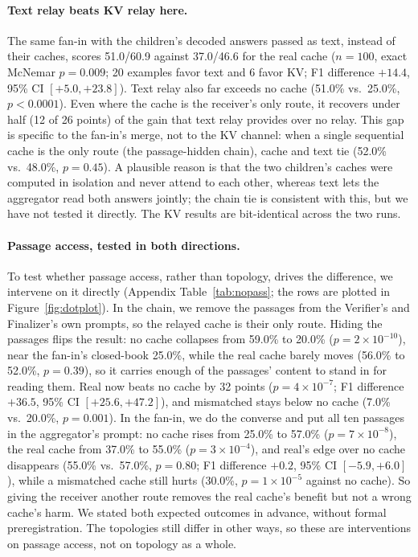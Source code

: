 \documentclass[11pt]{article}
\begin{document}
\paragraph{Text relay beats KV relay here.} The same fan-in with the children's
decoded answers passed as text, instead of their caches, scores 51.0/60.9 against
37.0/46.6 for the real cache ($n{=}100$, exact McNemar $p=0.009$; 20 examples
favor text and 6 favor KV; F1 difference $+14.4$, 95\% CI $[+5.0,+23.8]$). Text
relay also far exceeds no cache (51.0\% vs.\ 25.0\%, $p<0.0001$). Even where
the cache is the receiver's only route, it recovers under half (12 of 26 points) of
the gain that text relay provides over no relay. This gap is specific to
the fan-in's merge, not to the KV channel: when a single sequential cache is the
only route (the passage-hidden chain), cache and text tie (52.0\% vs.\ 48.0\%,
$p=0.45$). A plausible reason is that the two children's caches were computed in
isolation and never attend to each other, whereas text lets the aggregator read both
answers jointly; the chain tie is consistent with this, but we have not tested it
directly. The KV results are bit-identical across the two runs.



\paragraph{Passage access, tested in both directions.} To test whether passage
access, rather than topology, drives the difference, we intervene on it directly
(Appendix Table~\ref{tab:nopass}; the rows are plotted in
Figure~\ref{fig:dotplot}). In the chain, we remove the passages from the
Verifier's and Finalizer's own prompts, so the relayed cache is their only route.
Hiding the passages flips the result: no cache collapses from 59.0\% to
20.0\% ($p=2\times10^{-10}$), near the fan-in's closed-book 25.0\%, while the real
cache barely moves (56.0\% to 52.0\%, $p=0.39$), so it carries enough of the
passages' content to stand in for reading them. Real now beats no cache by 32
points ($p=4\times10^{-7}$; F1 difference $+36.5$, 95\% CI $[+25.6,+47.2]$), and
mismatched stays below no cache (7.0\% vs.\ 20.0\%, $p=0.001$). In the
fan-in, we do the converse and put all ten passages in the aggregator's prompt:
no cache rises from 25.0\% to 57.0\% ($p=7\times10^{-8}$), the real cache from
37.0\% to 55.0\% ($p=3\times10^{-4}$), and real's edge over no cache disappears
(55.0\% vs.\ 57.0\%, $p=0.80$; F1 difference $+0.2$, 95\% CI $[-5.9,+6.0]$), while
a mismatched cache still hurts (30.0\%, $p=1\times10^{-5}$ against no cache). So
giving the receiver another route removes the real cache's benefit but not
a wrong cache's harm. We stated both expected outcomes in advance, without formal preregistration. The
topologies still differ in other ways, so these are interventions on passage
access, not on topology as a whole.
\end{document}
